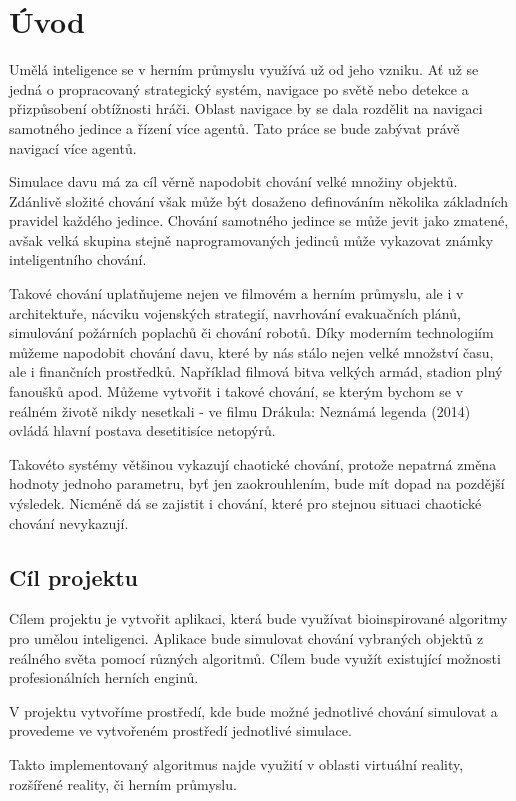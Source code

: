 \section{Úvod}
Umělá inteligence se v herním průmyslu využívá už od jeho vzniku. Ať už se jedná o propracovaný strategický systém, navigace po světě nebo detekce a přizpůsobení obtížnosti hráči. Oblast navigace by se dala rozdělit na navigaci samotného jedince a řízení více agentů. Tato práce se bude zabývat právě navigací více agentů. 
\par
Simulace davu má za cíl věrně napodobit chování velké množiny objektů. Zdánlivě složité chování však může být dosaženo definováním několika základních pravidel každého jedince. Chování samotného jedince se může jevit jako zmatené, avšak velká skupina stejně naprogramovaných jedinců může vykazovat známky inteligentního chování. 
\par
Takové chování uplatňujeme nejen ve filmovém a herním průmyslu, ale i v architektuře, nácviku vojenských strategií, navrhování evakuačních plánů, simulování požárních poplachů či chování robotů. \cite{gammaWeb} Díky moderním technologiím můžeme napodobit chování davu, které by nás stálo nejen velké množství času, ale i finančních prostředků. Například filmová bitva velkých armád, stadion plný fanoušků apod. Můžeme vytvořit i takové chování, se kterým bychom se v reálném životě nikdy nesetkali - ve filmu Drákula: Neznámá legenda (2014) ovládá hlavní postava desetitisíce netopýrů. \cite{DraculaYoutube}
\par 
Takovéto systémy většinou vykazují chaotické chování, protože nepatrná změna hodnoty jednoho parametru, byť jen zaokrouhlením, bude mít dopad na pozdější výsledek. Nicméně dá se zajistit i chování, které pro stejnou situaci chaotické chování nevykazují. 
\subsection{Cíl projektu}
Cílem projektu je vytvořit aplikaci, která bude využívat bioinspirované algoritmy pro umělou inteligenci. Aplikace bude simulovat chování vybraných objektů z reálného světa pomocí různých algoritmů. Cílem bude využít existující možnosti profesionálních herních enginů. 
\par
V projektu vytvoříme prostředí, kde bude možné jednotlivé chování simulovat a provedeme ve vytvořeném prostředí jednotlivé simulace. 
\par
Takto implementovaný algoritmus najde využití v oblasti virtuální reality, rozšířené reality, či herním průmyslu. 
